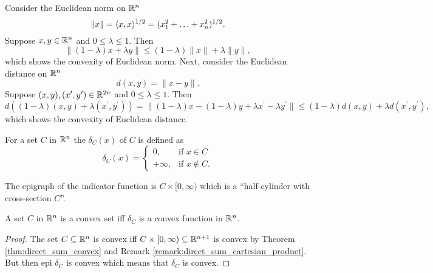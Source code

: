 \documentclass[11pt,a4paper]{article}
\begin{document}
\begin{remark}\label{remark:euclidean_norm_distance}
    Consider the Euclidean norm on $\mathbb{R}^n$ 
    \begin{equation*}
        \|x\| = \langle x, x \rangle^{1/2} = (x_1^2+\ldots+x_n^2)^{1/2}.
    \end{equation*}
    Suppose $x,y\in \mathbb{R}^n$ and $0\le\lambda\le 1$. Then
    \begin{equation*}
        \|(1-\lambda)x+\lambda y\| \le (1-\lambda)\|x\| + \lambda \|y\|,
    \end{equation*}
    which shows the convexity of Euclidean norm. Next, consider the Euclidean distance on $\mathbb{R}^n$
    \begin{equation*}
        d(x,y) = \|x-y\|.
    \end{equation*}
    Suppose $(x,y),(x^\prime,y^\prime)\in \mathbb{R}^{2n}$ and $0\le \lambda\le 1$. Then
    \begin{equation*}
        d((1-\lambda)(x,y) + \lambda (x^\prime,y^\prime)) = \|(1-\lambda)x -(1-\lambda) y + \lambda x^\prime -\lambda y^\prime\| \le (1-\lambda) d(x,y) + \lambda d(x^\prime,y^\prime),
    \end{equation*}
    which shows the convexity of Euclidean distance.
\end{remark}

\begin{definition}
    For a set $C$ in $\mathbb{R}^n$ the  $\delta_C(x)$ of $C$ is defined as 
    \begin{equation*}
        \delta_C(x) = 
        \begin{cases}
			0, & \text{if }x\in C\\
            +\infty, & \text{if } x\notin C.
        \end{cases}
    \end{equation*}
\end{definition}

\begin{remark}
    The epigraph of the indicator function is $C\times [0,\infty)$ which is a ``half-cylinder with cross-section $C$''. 
\end{remark}

\begin{proposition}
    A set $C$ in $\mathbb{R}^n$ is a convex set iff $\delta_C$ is a convex function in $\mathbb{R}^n$. 
\end{proposition}

\begin{proof}
    The set $C\subseteq\mathbb{R}^n$ is convex iff $C\times [0,\infty)\subseteq\mathbb{R}^{n+1}$ is convex by Theorem \ref{thm:direct_sum_convex} and Remark \ref{remark:direct_sum_cartesian_product}. But then epi $\delta_C$ is convex which means that $\delta_C$ is convex.
\end{proof}
\end{document}
